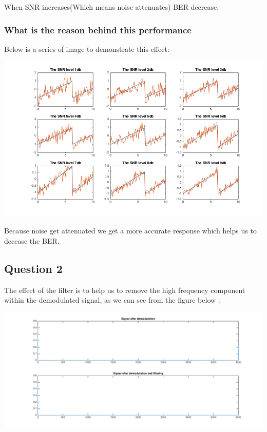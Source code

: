 \documentclass[11pt]{scrartcl}
\begin{document}
When SNR increases(Which means noise attenuates) BER decrease. 

\subsubsection{What is the reason behind this performance}
Below is a series of image to demonstrate this effect:

\begin{minipage}[t]{\linewidth}
{
\includegraphics[scale = 0.6]{demo_snr.png}
}
\end{minipage}
\medskip

Because noise get attenuated we get a more accurate response which helps us to decease the BER.

\subsection{Question 2}

The effect of the filter is to help us to remove the high frequency component within the demodulated signal, as we can see from the figure below :

\begin{center}
\begin{minipage}[t]{\linewidth}

{
\includegraphics[scale = 0.5]{butter.png}
}
\end{minipage}
\medskip
\end{center}
  
\end{document}
